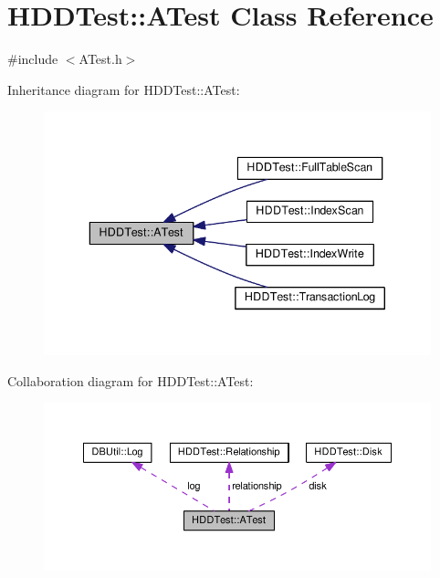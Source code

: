 \hypertarget{class_h_d_d_test_1_1_a_test}{\section{H\-D\-D\-Test\-:\-:A\-Test Class Reference}
\label{class_h_d_d_test_1_1_a_test}
}


{\ttfamily \#include $<$A\-Test.\-h$>$}



Inheritance diagram for H\-D\-D\-Test\-:\-:A\-Test\-:
\nopagebreak
\begin{figure}[H]
\begin{center}
\leavevmode
\includegraphics[width=340pt]{class_h_d_d_test_1_1_a_test__inherit__graph}
\end{center}
\end{figure}


Collaboration diagram for H\-D\-D\-Test\-:\-:A\-Test\-:\nopagebreak
\begin{figure}[H]
\begin{center}
\leavevmode
\includegraphics[width=350pt]{class_h_d_d_test_1_1_a_test__coll__graph}
\end{center}
\end{figure}
